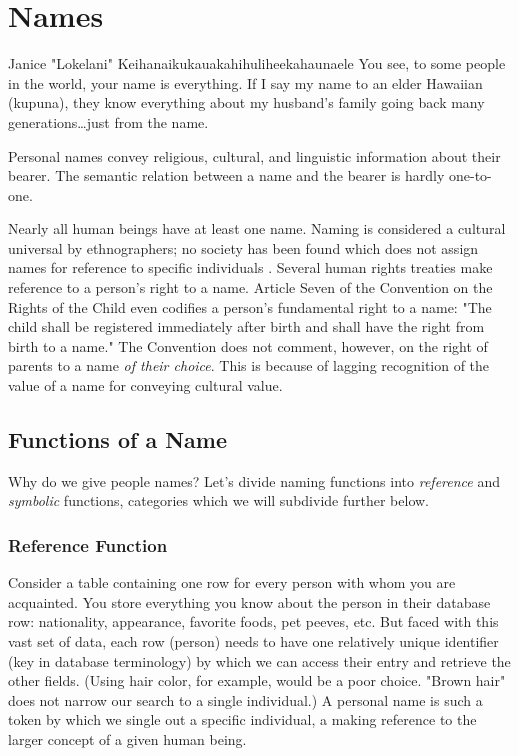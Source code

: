 \section{Names}

\begin{aquote}{Janice "Lokelani" Keihanaikukauakahihuliheekahaunaele
	\parencite{lee-valley}}
	You see, to some people in the world, your name is everything. If I say my
	name to an elder Hawaiian (kupuna), they know everything about my husband's
	family going back many generations…just from the name.
\end{aquote}

Personal names convey religious, cultural, and linguistic information about
their bearer. The semantic relation between a name and the bearer is hardly
one-to-one.

Nearly all human beings have at least one name. Naming is considered a cultural
universal by ethnographers; no society has been found which does not assign
names for reference to specific individuals \parencite{alford88}. Several human
rights treaties make reference to a person's right to a name. Article Seven of
the Convention on the Rights of the Child even codifies a person's fundamental
right to a name: "The child shall be registered immediately after birth and
shall have the right from birth to a name." \parencite{crc} The Convention does
not comment, however, on the right of parents to a name \textit{of their
choice}. This is because of lagging recognition of the value of a name for
conveying cultural value.

\subsection{Functions of a Name}

Why do we give people names? Let's divide naming functions into
\textit{reference} and \textit{symbolic} functions, categories which we will
subdivide further below.

\subsubsection{Reference Function}

Consider a table containing one row for every person with whom you are
acquainted. You store everything you know about the person in their database
row: nationality, appearance, favorite foods, pet peeves, etc. But faced with
this vast set of data, each row (person) needs to have one relatively unique
identifier (key in database terminology) by which we can access their entry and
retrieve the other fields. (Using hair color, for example, would be a poor
choice. "Brown hair" does not narrow our search to a single individual.) A
personal name is such a token by which we single out a specific individual, a
making reference to the larger concept of a given human being.

